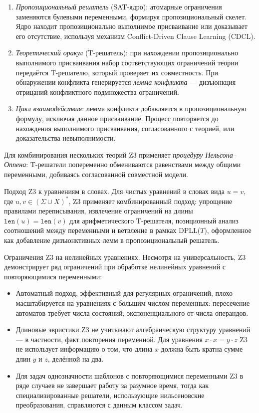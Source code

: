 \documentclass[14pt, russian]{scrartcl}
\begin{document}
\begin{enumerate}
\item \textit{Пропозициональный решатель} (SAT-ядро): атомарные ограничения заменяются
  булевыми переменными, формируя пропозициональный скелет. Ядро находит пропозиционально
  выполнимое присваивание или доказывает его отсутствие, используя механизм
  Conflict-Driven Clause Learning (CDCL).
\item \textit{Теоретический оракул} (T-решатель): при нахождении пропозиционально
  выполнимого присваивания набор соответствующих ограничений теории передаётся
  T-решателю, который проверяет их совместность. При обнаружении конфликта
  генерируется \textit{лемма конфликта} --- дизъюнкция отрицаний конфликтного
  подмножества ограничений.
\item \textit{Цикл взаимодействия}: лемма конфликта добавляется в пропозициональную
  формулу, исключая данное присваивание. Процесс повторяется до нахождения
  выполнимого присваивания, согласованного с теорией, или доказательства невыполнимости.
\end{enumerate}

Для комбинирования нескольких теорий Z3 применяет \textit{процедуру Нельсона--Оппена}:
T-решатели попеременно обмениваются равенствами между общими переменными,
добиваясь согласованной совместной модели.

\medskip Подход Z3 к уравнениям в словах.
Для чистых уравнений в словах вида $u = v$, где $u, v \in (\Sigma \cup X)^*$,
Z3 применяет комбинированный подход: упрощение правилами переписывания, извлечение
ограничений на длины $\texttt{len}(u) = \texttt{len}(v)$ для арифметического
T-решателя, позиционный анализ соотношений между переменными и ветвление в рамках
DPLL($T$), оформленное как добавление дизъюнктивных лемм в пропозициональный
решатель.

\medskip Ограничения Z3 на нелинейных уравнениях.
Несмотря на универсальность, Z3 демонстрирует ряд ограничений при обработке
нелинейных уравнений с повторяющимися переменными:

\begin{itemize}
\item Автоматный подход, эффективный для регулярных ограничений, плохо
  масштабируется на уравнениях с большим числом переменных: пересечение
  автоматов требует числа состояний, экспоненциального от числа операндов.
\item Длиновые эвристики Z3 не учитывают алгебраическую структуру уравнений ---
  в частности, факт повторения переменной. Для уравнения $x \cdot x = y \cdot z$
  Z3 не использует информацию о том, что длина $x$ должна быть кратна сумме
  длин $y$ и $z$, делённой на два.
\item Для задач однозначности шаблонов с повторяющимися переменными Z3 в ряде
  случаев не завершает работу за разумное время, тогда как специализированные
  решатели, использующие нильсеновские преобразования, справляются с данным
  классом задач.
\end{itemize}
\end{document}
